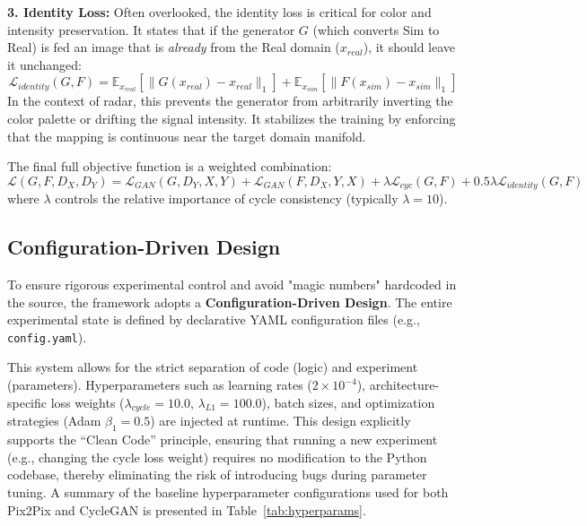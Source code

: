 \textbf{3. Identity Loss:}
Often overlooked, the identity loss is critical for color and intensity preservation.
It states that if the generator $G$ (which converts Sim to Real) is fed an image that is \textit{already} from the Real domain ($x_{real}$), it should leave it unchanged:
$$
\mathcal{L}_{identity}(G, F)
=
\mathbb{E}_{x_{real}}
\left[\|G(x_{real}) - x_{real}\|_1\right]
+
\mathbb{E}_{x_{sim}}
\left[\|F(x_{sim}) - x_{sim}\|_1\right]
$$
In the context of radar, this prevents the generator from arbitrarily inverting the color palette or drifting the signal intensity.
It stabilizes the training by enforcing that the mapping is continuous near the target domain manifold.

The final full objective function is a weighted combination:
$$ \mathcal{L}(G, F, D_X, D_Y) = \mathcal{L}_{GAN}(G, D_Y, X, Y) + \mathcal{L}_{GAN}(F, D_X, Y, X) + \lambda \mathcal{L}_{cyc}(G, F) + 0.5 \lambda \mathcal{L}_{identity}(G, F) $$
where $\lambda$ controls the relative importance of cycle consistency (typically $\lambda=10$).

\subsection{Configuration-Driven Design}
To ensure rigorous experimental control and avoid "magic numbers" hardcoded in the source, the framework adopts a \textbf{Configuration-Driven Design}.
The entire experimental state is defined by declarative YAML configuration files (e.g., \texttt{config.yaml}).

This system allows for the strict separation of code (logic) and experiment (parameters).
Hyperparameters such as learning rates ($2 \times 10^{-4}$), architecture-specific loss weights ($\lambda_{cycle}=10.0$, $\lambda_{L1}=100.0$), batch sizes, and optimization strategies (Adam $\beta_1=0.5$) are injected at runtime.
This design explicitly supports the \enquote{Clean Code} principle, ensuring that running a new experiment (e.g., changing the cycle loss weight) requires no modification to the Python codebase, thereby eliminating the risk of introducing bugs during parameter tuning.
A summary of the baseline hyperparameter configurations used for both Pix2Pix and CycleGAN is presented in Table~\ref{tab:hyperparams}.

